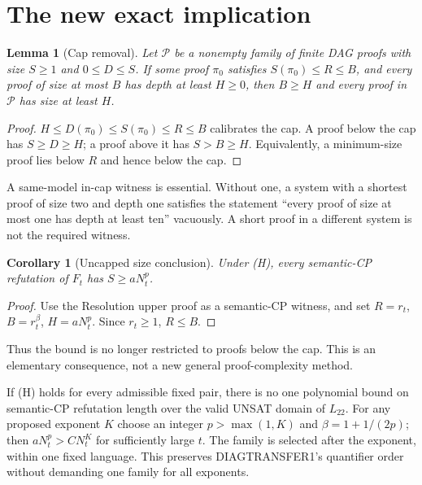\documentclass[11pt]{article}
\newtheorem{lemma}[theorem]{Lemma}
\newtheorem{corollary}[theorem]{Corollary}
\begin{document}
\section{The new exact implication}
\begin{lemma}[Cap removal]
Let $\mathcal P$ be a nonempty family of finite DAG proofs with size $S\ge1$ and $0\le D\le S$.
If some proof $\pi_0$ satisfies $S(\pi_0)\le R\le B$, and every proof of
size at most $B$ has depth at least $H\ge0$, then $B\ge H$ and every proof
in $\mathcal P$ has size at least $H$.
\end{lemma}
\begin{proof}
$H\le D(\pi_0)\le S(\pi_0)\le R\le B$ calibrates the cap. A proof below
the cap has $S\ge D\ge H$; a proof above it has $S>B\ge H$.
Equivalently, a minimum-size proof lies below $R$ and hence below the cap.
\end{proof}
A same-model in-cap witness is essential. Without one, a system with a
shortest proof of size two and depth one satisfies the statement ``every
proof of size at most one has depth at least ten'' vacuously. A short proof
in a different system is not the required witness.

\begin{corollary}[Uncapped size conclusion]
Under (H), every semantic-CP refutation of $F_t$ has $S\ge aN_t^p$.
\end{corollary}
\begin{proof}
Use the Resolution upper proof as a semantic-CP witness, and set
$R=r_t$, $B=r_t^\beta$, $H=aN_t^p$. Since $r_t\ge1$, $R\le B$.
\end{proof}
Thus the bound is no longer restricted to proofs below the cap. This is
an elementary consequence, not a new general proof-complexity method.

If (H) holds for every admissible fixed pair, there is no one polynomial
bound on semantic-CP refutation length over the valid UNSAT domain of
$L_{22}$. For any proposed exponent $K$ choose an integer $p>\max(1,K)$
and $\beta=1+1/(2p)$; then $aN_t^p>CN_t^K$ for sufficiently large $t$.
The family is selected after the exponent, within one fixed language. This
preserves DIAGTRANSFER1's quantifier order without demanding one family for
all exponents.
\end{document}
